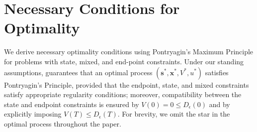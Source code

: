 \documentclass[letterpaper, 10 pt, conference]{ieeeconf}
\begin{document}
\section{Necessary Conditions for Optimality}
\label{sec:optimality}

We derive necessary optimality conditions using Pontryagin's Maximum Principle for problems with state, mixed, and end-point constraints.
Under our standing assumptions, \cite[Theorem~3.1]{arutyunov2011maximum} guarantees that an optimal process $(\boldsymbol{s}^*, \boldsymbol{x}^*, V^*, u^*)$ satisfies Pontryagin's Principle, provided that the endpoint, state, and mixed constraints satisfy appropriate regularity conditions; moreover, compatibility between the state and endpoint constraints is ensured by \(V(0)=0\le D_{\epsilon}(0)\) and by explicitly imposing \(V(T)\le D_{\epsilon}(T)\). 
For brevity, we omit the star in the optimal process throughout the paper.
\end{document}
